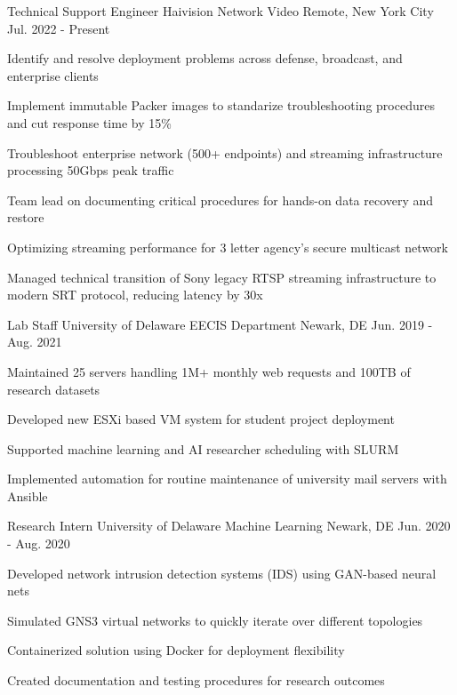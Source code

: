 \documentclass[11pt, letterpaper]{awesome-cv}
\begin{document}
\begin{cventries}

  \cventry
    {Technical Support Engineer} %
    {Haivision Network Video} %
    {Remote, New York City} %
    {Jul. 2022 - Present} %
    {
      \begin{cvitems} %
        \item {Identify and resolve deployment problems across defense, broadcast, and enterprise clients}
        \item {Implement immutable Packer images to standarize troubleshooting procedures and cut response time by 15\%}
        \item {Troubleshoot enterprise network (500+ endpoints) and streaming infrastructure processing 50Gbps peak traffic}
        \item {Team lead on documenting critical procedures for hands-on data recovery and restore}
        \item {Optimizing streaming performance for 3 letter agency's secure multicast network}
        \item {Managed technical transition of Sony legacy RTSP streaming infrastructure to modern SRT protocol, reducing latency by 30x}
      \end{cvitems}
    }

\vspace{0.5cm}
  \cventry
    {Lab Staff}
    {University of Delaware EECIS Department}
    {Newark, DE}
    {Jun. 2019 - Aug. 2021}
    {
      \begin{cvitems}
        \item {Maintained 25 servers handling 1M+ monthly web requests and 100TB of research datasets}
        \item {Developed new ESXi based VM system for student project deployment}
        \item {Supported machine learning and AI researcher scheduling with SLURM}
        \item {Implemented automation for routine maintenance of university mail servers with Ansible}
      \end{cvitems}
    }

\vspace{0.5cm}
  \cventry
    {Research Intern}
    {University of Delaware Machine Learning}
    {Newark, DE}
    {Jun. 2020 - Aug. 2020}
    {
      \begin{cvitems}
        \item {Developed network intrusion detection systems (IDS) using GAN-based neural nets}
        \item {Simulated GNS3 virtual networks to quickly iterate over different topologies}
        \item {Containerized solution using Docker for deployment flexibility}
        \item {Created documentation and testing procedures for research outcomes}
      \end{cvitems}
    }


\end{cventries}
\end{document}
